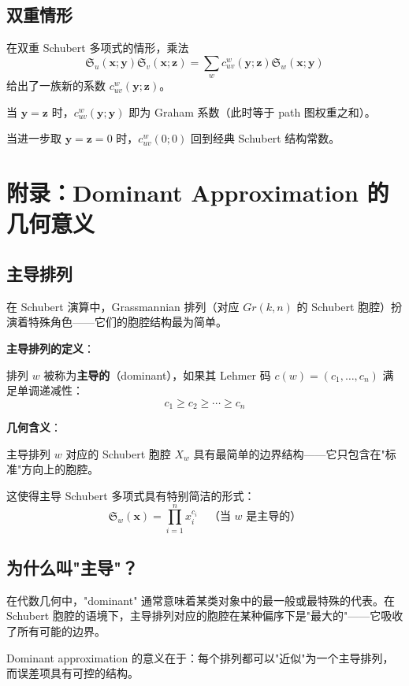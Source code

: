 \subsection*{双重情形}

在双重 Schubert 多项式的情形，乘法
$$\mathfrak{S}_u(\mathbf{x};\mathbf{y}) \mathfrak{S}_v(\mathbf{x};\mathbf{z}) = \sum_w c_{uv}^w(\mathbf{y};\mathbf{z}) \mathfrak{S}_w(\mathbf{x};\mathbf{y})$$
给出了一族新的系数 $c_{uv}^w(\mathbf{y};\mathbf{z})$。

当 $\mathbf{y} = \mathbf{z}$ 时，$c_{uv}^w(\mathbf{y};\mathbf{y})$ 即为 Graham 系数（此时等于 path 图权重之和）。

当进一步取 $\mathbf{y} = \mathbf{z} = 0$ 时，$c_{uv}^w(0;0)$ 回到经典 Schubert 结构常数。

\section{附录：Dominant Approximation 的几何意义}
\label{sec:appendix-ch2-dominant-geometry}

\subsection*{主导排列}

在 Schubert 演算中，Grassmannian 排列（对应 $Gr(k,n)$ 的 Schubert 胞腔）扮演着特殊角色——它们的胞腔结构最为简单。

\textbf{主导排列的定义}：

排列 $w$ 被称为\textbf{主导的}（dominant），如果其 Lehmer 码 $c(w) = (c_1, \ldots, c_n)$ 满足单调递减性：
$$c_1 \geq c_2 \geq \cdots \geq c_n$$

\textbf{几何含义}：

主导排列 $w$ 对应的 Schubert 胞腔 $X_w$ 具有最简单的边界结构——它只包含在"标准"方向上的胞腔。

这使得主导 Schubert 多项式具有特别简洁的形式：
$$\mathfrak{S}_w(\mathbf{x}) = \prod_{i=1}^n x_i^{c_i} \quad \text{（当 $w$ 是主导的）}$$

\subsection*{为什么叫"主导"？}

在代数几何中，"dominant" 通常意味着某类对象中的最一般或最特殊的代表。在 Schubert 胞腔的语境下，主导排列对应的胞腔在某种偏序下是"最大的"——它吸收了所有可能的边界。

Dominant approximation 的意义在于：每个排列都可以"近似"为一个主导排列，而误差项具有可控的结构。

